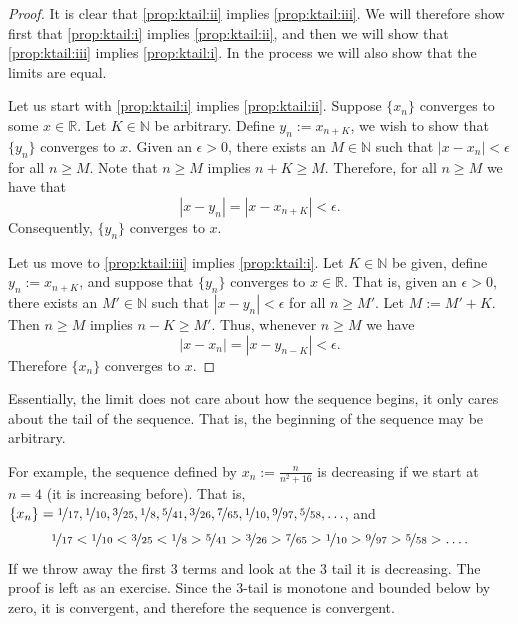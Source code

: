 \documentclass[12pt]{book}
\newcommand{\abs}[1]{\left\lvert {#1} \right\rvert}
\newcommand{\R}{{\mathbb{R}}}
\newcommand{\N}{{\mathbb{N}}}
\theoremstyle{plain}
\theoremstyle{remark}
\theoremstyle{definition}
\theoremstyle{exercise}
\theoremstyle{example}
\begin{document}
\begin{proof}
It is clear that
\ref{prop:ktail:ii} implies \ref{prop:ktail:iii}.
We will therefore show first that
\ref{prop:ktail:i}
implies
\ref{prop:ktail:ii},
and then we will show that
\ref{prop:ktail:iii}
implies
\ref{prop:ktail:i}.  In the process we will also show that the limits are equal.

Let us start with \ref{prop:ktail:i} implies \ref{prop:ktail:ii}.
Suppose $\{x_n \}$ converges to some $x \in \R$.
Let $K \in \N$ be arbitrary.
Define $y_n := x_{n+K}$, we wish to show that $\{ y_n \}$ converges
to $x$.
Given an $\epsilon > 0$, there exists an $M \in \N$ such that
$\abs{x-x_n} < \epsilon$ for all $n \geq M$.
Note that $n \geq M$ implies $n+K \geq M$.  Therefore, for
all $n \geq M$ we have that 
\begin{equation*}
\abs{x-y_n} = \abs{x-x_{n+K}} < \epsilon .
\end{equation*}
Consequently, $\{ y_n \}$ converges to $x$.

Let us move to \ref{prop:ktail:iii} implies \ref{prop:ktail:i}.
Let $K \in \N$ be given, define
$y_n := x_{n+K}$, and suppose that $\{ y_n \}$ converges to $x \in \R$.
That is, given an $\epsilon > 0$, there exists an $M' \in \N$ such that
$\abs{x-y_n} < \epsilon$ for all $n \geq M'$.
Let $M := M'+K$.  Then $n \geq M$ implies $n-K \geq M'$.
Thus, whenever $n \geq M$ we have
\begin{equation*}
\abs{x-x_n} = \abs{x-y_{n-K}} < \epsilon.
\end{equation*}
Therefore $\{ x_n \}$ converges to $x$.
\end{proof}

Essentially, the limit does not care about how the sequence begins, it only
cares about the tail of the sequence.  That is, the beginning of the sequence
may be arbitrary.

For example, the sequence defined by $x_n := \frac{n}{n^2+16}$ is decreasing
if we start at $n=4$ (it is increasing before).  That is,
$\{ x_n \} =
\nicefrac{1}{17},
\nicefrac{1}{10},
\nicefrac{3}{25},
\nicefrac{1}{8},
\nicefrac{5}{41},
\nicefrac{3}{26},
\nicefrac{7}{65},
\nicefrac{1}{10},
\nicefrac{9}{97},
\nicefrac{5}{58},\ldots$, and 
\begin{equation*}
\nicefrac{1}{17} <
\nicefrac{1}{10} <
\nicefrac{3}{25} <
\nicefrac{1}{8} >
\nicefrac{5}{41} >
\nicefrac{3}{26} >
\nicefrac{7}{65} >
\nicefrac{1}{10} >
\nicefrac{9}{97} >
\nicefrac{5}{58} > \ldots .
\end{equation*}
If we throw away the first 3 terms
and look at the 3 tail it is decreasing.  The proof is left as an exercise.  Since the 3-tail
is monotone and bounded below by zero, it is convergent, and therefore the sequence is convergent.
\end{document}
